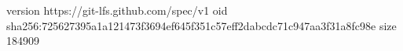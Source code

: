 version https://git-lfs.github.com/spec/v1
oid sha256:725627395a1a121473f3694ef645f351c57eff2dabcdc71c947aa3f31a8fc98e
size 184909
